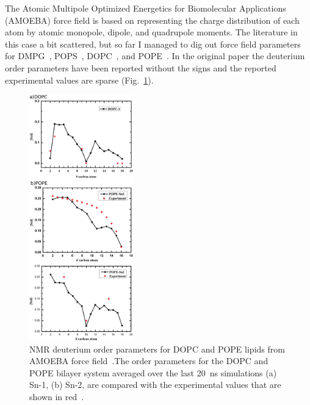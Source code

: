 \documentclass[12pt]{article}
\begin{document}
The Atomic Multipole Optimized Energetics for Biomolecular Applications (AMOEBA)
force field is based on representing the charge distribution of each atom by
atomic monopole, dipole, and quadrupole moments. The literature in this case a
bit scattered, but so far I managed to dig out force field parameters for DMPG~\cite{chu2018anionicpolarizable},
POPS~\cite{chu2018anionicpolarizable}, DOPC~\cite{chu2018polarizable}, and POPE~\cite{chu2018polarizable}. In the original paper the deuterium order
parameters have been reported without the signs and the reported experimental
values are sparse (Fig.~\ref{fig:amoebadopc}).\\

\begin{figure}[!hbt]
  \centering
  \includegraphics[width=0.4\textwidth]{../Figures/order_parameter_amoeba.png}
  \caption{NMR deuterium order parameters for DOPC and POPE lipids from AMOEBA
  force field~\cite{chu2018polarizable}.The order parameters for the DOPC and POPE bilayer system averaged over the last 20~ns simulations (a) Sn-1, (b) Sn-2, are compared with the experimental values that are shown in red~\cite{seelig1978molecular,perly1985acyl,shaikh2002monounsaturated}.}
\label{fig:amoebadopc}
\end{figure}
\end{document}
